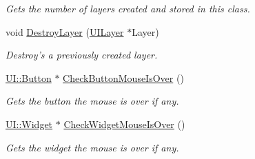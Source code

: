 \begin{DoxyCompactItemize}
\begin{DoxyCompactList}\small\item\em Gets the number of layers created and stored in this class. \item\end{DoxyCompactList}\item 
void \hyperlink{classphys_1_1UIScreen_ac1d9dfc0b8d9b3720f1447dcc93d8b55}{DestroyLayer} (\hyperlink{classphys_1_1UILayer}{UILayer} $\ast$Layer)
\begin{DoxyCompactList}\small\item\em Destroy's a previously created layer. \item\end{DoxyCompactList}\item 
\hyperlink{classphys_1_1UI_1_1Button}{UI::Button} $\ast$ \hyperlink{classphys_1_1UIScreen_a7bc1a10b2172ad8885901de1a65a819d}{CheckButtonMouseIsOver} ()
\begin{DoxyCompactList}\small\item\em Gets the button the mouse is over if any. \item\end{DoxyCompactList}\item 
\hyperlink{classphys_1_1UI_1_1Widget}{UI::Widget} $\ast$ \hyperlink{classphys_1_1UIScreen_a00befef8c7bce9e8d149e6ba03419a53}{CheckWidgetMouseIsOver} ()
\begin{DoxyCompactList}\small\item\em Gets the widget the mouse is over if any. \item\end{DoxyCompactList}\end{DoxyCompactItemize}
